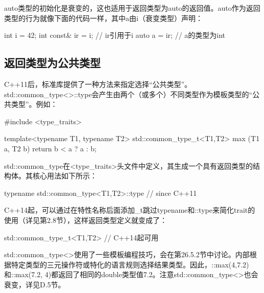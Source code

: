 auto类型的初始化是衰变的，这也适用于返回类型为auto的返回值。auto作为返回类型的行为就像下面的代码一样，其中a由i（衰变类型）声明：

\begin{cpp}
int i = 42;
int const& ir = i; // ir引用于i
auto a = ir; // a的类型为int
\end{cpp}

\subsection{返回类型为公共类型}

C++11后，标准库提供了一种方法来指定选择“公共类型”。std::common\_type<>::type会产生由两个（或多个）不同类型作为模板类型的“公共类型”。例如：

\begin{cpp}
#include <type_traits>

template<typename T1, typename T2>
std::common_type_t<T1,T2> max (T1 a, T2 b) {
	return b < a ? a : b;
}
\end{cpp}

std::common\_type在<type\_traits>头文件中定义，其生成一个具有返回类型的结构体。其核心用法如下所示：

\begin{cpp}
typename std::common_type<T1,T2>::type // since C++11
\end{cpp}

C++14起，可以通过在特性名称后面添加\_t跳过typename和::type来简化trait的使用（详见第2.8节），这样返回类型定义就变成了：

\begin{cpp}
std::common_type_t<T1,T2> // C++14起可用
\end{cpp}

std::common\_type<>使用了一些模板编程技巧，会在第26.5.2节中讨论。内部根据特定类型的三元操作符或特化的语言规则选择结果类型。因此，::max(4,7.2)和::max(7.2, 4)都返回了相同的double类型值7.2。注意std::common\_type<>也会衰变，详见D.5节。




